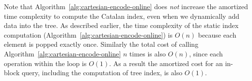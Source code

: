 Note that Algorithm~\ref{alg:cartesian-encode-online} does {\em not}
increase the amortized time complexity to compute the Catalan index,
even when we dynamically add data into the tree.  As described
earlier, the time complexity of the static index computation
(Algorithm~\ref{alg:cartesian-encode-online}) is $O(n)$ because each
element is popped exactly once.  Similarly the total cost of calling
Algorithm~\ref{alg:cartesian-encode-online} $n$ times is also $O(n)$,
since each operation within the loop is $O(1)$.  As a result the
amortized cost for an in-block query, including the computation of
tree index, is also $O(1)$.

\iffalse
最後，我們不改變原本的建立笛卡爾樹算法，便能在過程中擭得樹的編號，
每一次的 in-block 詢問只需要一次記憶體存取，得到任一操作攤銷複雜度 $\theta(1)$。
\fi
